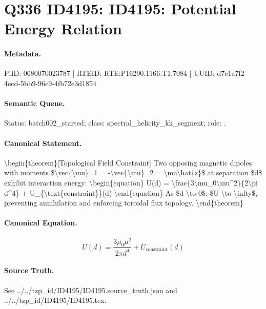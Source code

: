 \section*{Q336 ID4195: ID4195: Potential Energy Relation}
\paragraph{Metadata.}
PiID: 0680070023787 | RTEID: RTE:P16290.1166:T1.7084 | UUID: d7c1a7f2-4ecd-5bb9-96c9-4fb72e3d1854

\paragraph{Semantic Queue.}
Status: batch002\_started; class: spectral\_helicity\_kk\_segment; role: .

\paragraph{Canonical Statement.}
\textbackslash{}begin\{theorem\}[Topological Field Constraint] Two opposing magnetic dipoles with moments \$\textbackslash{}vec\{\textbackslash{}mu\}\_1 = -\textbackslash{}vec\{\textbackslash{}mu\}\_2 = \textbackslash{}mu\textbackslash{}hat\{z\}\$ at separation \$d\$ exhibit interaction energy: \textbackslash{}begin\{equation\} U(d) = \textbackslash{}frac\{3\textbackslash{}mu\_0\textbackslash{}mu\textasciicircum{}2\}\{2\textbackslash{}pi d\textasciicircum{}4\} + U\_\{\textbackslash{}text\{constraint\}\}(d) \textbackslash{}end\{equation\} As \$d \textbackslash{}to 0\$: \$U \textbackslash{}to \textbackslash{}infty\$, preventing annihilation and enforcing toroidal flux topology. \textbackslash{}end\{theorem\}

\paragraph{Canonical Equation.}
\[
\begin{equation} U(d) = \frac{3\mu_0\mu^2}{2\pi d^4} + U_{\text{constraint}}(d) \end{equation}
\]

\paragraph{Source Truth.}
See ../../tzp\_id/ID4195/ID4195.source\_truth.json and ../../tzp\_id/ID4195/ID4195.tex.
